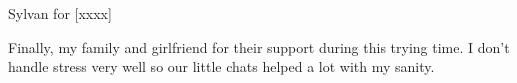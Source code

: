\documentclass[a4paper,12pt]{report}
\begin{document}
{Sylvan for [xxxx]

Finally, my family and girlfriend for their support during this trying time. I don't handle stress very well so our little chats helped a lot with my sanity.

\newpage



\tableofcontents

\newpage
\listoffigures



\newpage
\fancyhead[RE,LO]{}
\fancyhead[LE]{\leftmark}
\fancyhead[RO]{\rightmark}
\pagestyle{fancy}








%
%
%
%








%
\appendix
%
%


%


}
\end{document}
